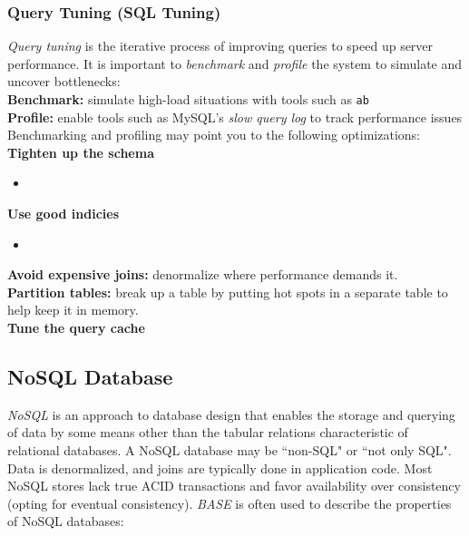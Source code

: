 \documentclass[12pt, titlepage]{article}
\begin{document}
\subsubsection{Query Tuning (SQL Tuning)}

\textit{Query tuning} is the iterative process of improving queries to speed up server performance. It is important to \textit{benchmark} and \textit{profile} the system to simulate and uncover bottlenecks: \\

\textbf{Benchmark:} simulate high-load situations with tools such as \texttt{ab} \medskip \\
\textbf{Profile:} enable tools such as MySQL's \textit{slow query log} to track performance issues \\

Benchmarking and profiling may point you to the following optimizations: \\

\textbf{Tighten up the schema}
\begin{itemize}
  \item 
\end{itemize}

\textbf{Use good indicies}
\begin{itemize}
  \item 
\end{itemize}

\textbf{Avoid expensive joins:} denormalize where performance demands it. \\

\textbf{Partition tables:} break up a table by putting hot spots in a separate table to help keep it in memory. \\

\textbf{Tune the query cache} \\

\subsection{NoSQL Database}

\textit{NoSQL} is an approach to database design that enables the storage and querying of data by some means other than the tabular relations characteristic of relational databases. A NoSQL database may be ``non-SQL" or ``not only SQL". \\

Data is denormalized, and joins are typically done in application code. Most NoSQL stores lack true ACID transactions and favor availability over consistency (opting for eventual consistency). \textit{BASE} is often used to describe the properties of NoSQL databases: \\
\end{document}
